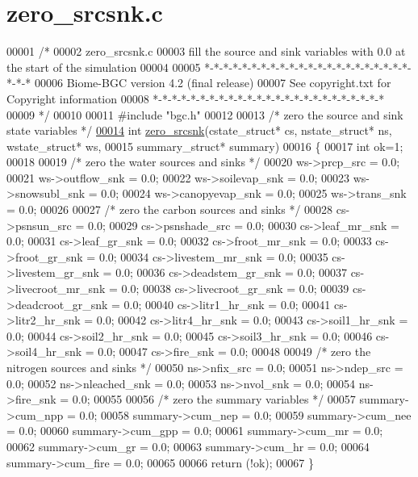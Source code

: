 \hypertarget{zero__srcsnk_8c_source}{}\section{zero\+\_\+srcsnk.\+c}
\label{zero__srcsnk_8c_source}

\begin{DoxyCode}
00001 \textcolor{comment}{/* }
00002 \textcolor{comment}{zero\_srcsnk.c}
00003 \textcolor{comment}{fill the source and sink variables with 0.0 at the start of the simulation}
00004 \textcolor{comment}{}
00005 \textcolor{comment}{*-*-*-*-*-*-*-*-*-*-*-*-*-*-*-*-*-*-*-*-*-*-*-*-*}
00006 \textcolor{comment}{Biome-BGC version 4.2 (final release)}
00007 \textcolor{comment}{See copyright.txt for Copyright information}
00008 \textcolor{comment}{*-*-*-*-*-*-*-*-*-*-*-*-*-*-*-*-*-*-*-*-*-*-*-*-*}
00009 \textcolor{comment}{*/}
00010 
00011 \textcolor{preprocessor}{#include "bgc.h"}
00012 
00013 \textcolor{comment}{/* zero the source and sink state variables */}
\hypertarget{zero__srcsnk_8c_source_l00014}{}\hyperlink{zero__srcsnk_8c_ad1fe85d82246f51079a60a61cf591a9c}{00014} \textcolor{keywordtype}{int} \hyperlink{zero__srcsnk_8c_ad1fe85d82246f51079a60a61cf591a9c}{zero\_srcsnk}(cstate\_struct* cs, nstate\_struct* ns, wstate\_struct* ws,
00015     summary\_struct* summary)
00016 \{
00017     \textcolor{keywordtype}{int} ok=1;
00018     
00019     \textcolor{comment}{/* zero the water sources and sinks  */}
00020     ws->prcp\_src = 0.0;
00021     ws->outflow\_snk = 0.0;
00022     ws->soilevap\_snk = 0.0;
00023     ws->snowsubl\_snk = 0.0;
00024     ws->canopyevap\_snk = 0.0;
00025     ws->trans\_snk = 0.0;
00026 
00027     \textcolor{comment}{/* zero the carbon sources and sinks */}
00028     cs->psnsun\_src = 0.0;
00029     cs->psnshade\_src = 0.0;
00030     cs->leaf\_mr\_snk = 0.0;
00031     cs->leaf\_gr\_snk = 0.0;
00032     cs->froot\_mr\_snk = 0.0;
00033     cs->froot\_gr\_snk = 0.0;
00034     cs->livestem\_mr\_snk = 0.0;
00035     cs->livestem\_gr\_snk = 0.0;
00036     cs->deadstem\_gr\_snk = 0.0;
00037     cs->livecroot\_mr\_snk = 0.0;
00038     cs->livecroot\_gr\_snk = 0.0;
00039     cs->deadcroot\_gr\_snk = 0.0;
00040     cs->litr1\_hr\_snk = 0.0;
00041     cs->litr2\_hr\_snk = 0.0;
00042     cs->litr4\_hr\_snk = 0.0;
00043     cs->soil1\_hr\_snk = 0.0;
00044     cs->soil2\_hr\_snk = 0.0;
00045     cs->soil3\_hr\_snk = 0.0;
00046     cs->soil4\_hr\_snk = 0.0;
00047     cs->fire\_snk = 0.0;
00048     
00049     \textcolor{comment}{/* zero the nitrogen sources and sinks */}
00050     ns->nfix\_src = 0.0;
00051     ns->ndep\_src = 0.0;
00052     ns->nleached\_snk = 0.0;
00053     ns->nvol\_snk = 0.0;
00054     ns->fire\_snk = 0.0;
00055     
00056     \textcolor{comment}{/* zero the summary variables */}
00057     summary->cum\_npp = 0.0;
00058     summary->cum\_nep = 0.0;
00059     summary->cum\_nee = 0.0;
00060     summary->cum\_gpp = 0.0;
00061     summary->cum\_mr = 0.0;
00062     summary->cum\_gr = 0.0;
00063     summary->cum\_hr = 0.0;
00064     summary->cum\_fire = 0.0;
00065     
00066     \textcolor{keywordflow}{return} (!ok);
00067 \}
\end{DoxyCode}
